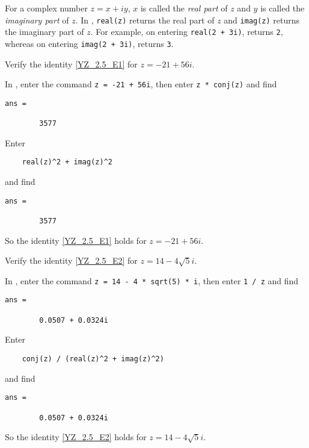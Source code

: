 \documentclass{ximera}
\begin{document}
For a complex number $z=x+iy$, $x$ is called the \textit{real part} of $z$ and $y$ is called the \textit{imaginary part} of $z$. In \Matlabp, {\tt real(z)} returns the real part of $z$ and {\tt imag(z)} returns the imaginary part of $z$. 
For example, on entering  {\tt real(2 + 3i)}, \Matlab returns {\tt 2}, whereas on entering {\tt imag(2 + 3i)}, \Matlab returns {\tt 3}.

\begin{computerExercise} \label{YZ_2.5_Matlab3}
Verify the identity \eqref{YZ_2.5_E1} for $z=-21+56i$.

\begin{solution}

\soln In \Matlab, enter the command {\tt z = -21 + 56i}, then enter {\tt z * conj(z)} and find
\begin{verbatim}
ans =

        3577
\end{verbatim}
Enter 
\begin{verbatim}
    real(z)^2 + imag(z)^2
\end{verbatim}
and find 
\begin{verbatim}
ans =

        3577
\end{verbatim}
So the identity \eqref{YZ_2.5_E1} holds for $z=-21+56i$.
\end{solution}
\end{computerExercise}

\begin{computerExercise} \label{YZ_2.5_Matlab4}
Verify the identity \eqref{YZ_2.5_E2} for $z=14-4\sqrt{5}i$.

\begin{solution}

\soln In \Matlab, enter the command {\tt z = 14 - 4 * sqrt(5) * i}, then enter {\tt 1 / z} and find
\begin{verbatim}
ans =

        0.0507 + 0.0324i
\end{verbatim}
Enter 
\begin{verbatim}
    conj(z) / (real(z)^2 + imag(z)^2)
\end{verbatim}
and find 
\begin{verbatim}
ans =

        0.0507 + 0.0324i
\end{verbatim}
So the identity \eqref{YZ_2.5_E2} holds for $z=14-4\sqrt{5}i$.
\end{solution}
\end{computerExercise}
\end{document}
